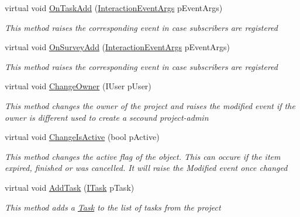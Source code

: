 \begin{DoxyCompactItemize}
virtual void \hyperlink{class_plex_byte_1_1_mo_cap_1_1_interactions_1_1_project_a70de0ac1540fa8d7eec9292379d83d0c}{On\+Task\+Add} (\hyperlink{class_plex_byte_1_1_mo_cap_1_1_interactions_1_1_interaction_event_args}{Interaction\+Event\+Args} p\+Event\+Args)
\begin{DoxyCompactList}\small\item\em This method raises the corresponding event in case subscribers are registered \end{DoxyCompactList}\item 
virtual void \hyperlink{class_plex_byte_1_1_mo_cap_1_1_interactions_1_1_project_a464040e9abe13cc8d09e71bedb81a1c2}{On\+Survey\+Add} (\hyperlink{class_plex_byte_1_1_mo_cap_1_1_interactions_1_1_interaction_event_args}{Interaction\+Event\+Args} p\+Event\+Args)
\begin{DoxyCompactList}\small\item\em This method raises the corresponding event in case subscribers are registered \end{DoxyCompactList}\item 
virtual void \hyperlink{class_plex_byte_1_1_mo_cap_1_1_interactions_1_1_project_a4e59d6c532937fb758e055af3fa2da77}{Change\+Owner} (I\+User p\+User)
\begin{DoxyCompactList}\small\item\em This method changes the owner of the project and raises the modified event if the owner is different used to create a secound project-\/admin \end{DoxyCompactList}\item 
virtual void \hyperlink{class_plex_byte_1_1_mo_cap_1_1_interactions_1_1_project_adcbdd39b8b64051e9bbdfffd25663116}{Change\+Is\+Active} (bool p\+Active)
\begin{DoxyCompactList}\small\item\em This method changes the active flag of the object. This can occure if the item expired, finished or was cancelled. It will raise the Modified event once changed \end{DoxyCompactList}\item 
virtual void \hyperlink{class_plex_byte_1_1_mo_cap_1_1_interactions_1_1_project_a4d3d0c6c63e3dc3162ec2f5a314bade1}{Add\+Task} (\hyperlink{interface_plex_byte_1_1_mo_cap_1_1_interactions_1_1_i_task}{I\+Task} p\+Task)
\begin{DoxyCompactList}\small\item\em This method adds a \hyperlink{class_plex_byte_1_1_mo_cap_1_1_interactions_1_1_task}{Task} to the list of tasks from the project \end{DoxyCompactList}\item 

\end{DoxyCompactItemize}
